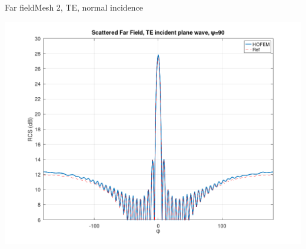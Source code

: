 
\begin{frame}{Far field}{Mesh 2, TE, normal incidence}

\includegraphics[width=0.9\linewidth]{results/pec_y_malla_fina_90_TE/FF.png}
  
\end{frame}


%
%
%  
%  
%
%
%  
%  


